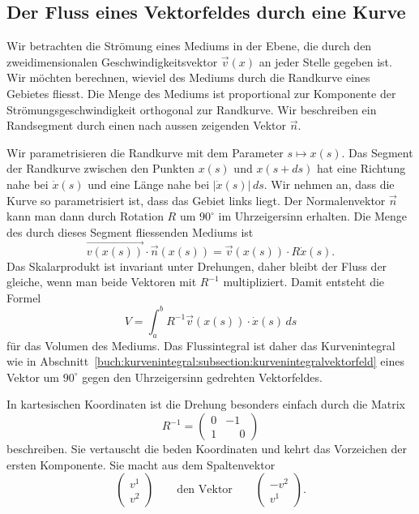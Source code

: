 %
%
\subsection{Der Fluss eines Vektorfeldes durch eine Kurve}
Wir betrachten die Strömung eines Mediums in der Ebene, die durch
den zweidimensionalen Geschwindigkeitsvektor $\vec{v}(x)$ an jeder
Stelle gegeben ist.
Wir möchten berechnen, wieviel des Mediums durch die Randkurve
eines Gebietes fliesst.
Die Menge des Mediums ist proportional zur Komponente der
Strömungsgeschwindigkeit orthogonal zur Randkurve.
%
Wir beschreiben ein Randsegment durch einen nach aussen
zeigenden Vektor $\vec{n}$.

Wir parametrisieren die Randkurve mit dem Parameter $s\mapsto x(s)$.
Das Segment der Randkurve zwischen den Punkten $x(s)$ und $x(s+ds)$
hat eine Richtung nahe bei $\dot{x}(s)$ und eine Länge 
nahe bei $|\dot{x}(s)|\,ds$.
Wir nehmen an, dass die Kurve so parametrisiert ist, dass das Gebiet
links liegt.
Der Normalenvektor $\vec{n}$ kann man dann durch Rotation $R$ um
$90^\circ$ im Uhrzeigersinn erhalten.
Die Menge des durch dieses Segment fliessenden Mediums ist
\[
\vec{v(x(s))}\cdot \vec{n}(x(s))
=
\vec{v}(x(s)) \cdot R\dot{x}(s).
\]
Das Skalarprodukt ist invariant unter Drehungen, daher bleibt der
Fluss der gleiche, wenn man beide Vektoren mit $R^{-1}$ multipliziert.
Damit entsteht die Formel
\[
V
=
\int_a^b 
R^{-1}\vec{v}(x(s))\cdot \dot{x}(s)
\,ds
\]
für das Volumen des Mediums.
Das Flussintegral ist daher das Kurvenintegral wie in
Abschnitt~\ref{buch:kurvenintegral:subsection:kurvenintegralvektorfeld}
eines Vektor um $90^\circ$ gegen den Uhrzeigersinn gedrehten
Vektorfeldes.

In kartesischen Koordinaten ist die Drehung besonders einfach durch
die Matrix 
\[
R^{-1}
=
\begin{pmatrix}
0&-1\\
1&\phantom{-}0
\end{pmatrix}
\]
beschreiben.
Sie vertauscht die beden Koordinaten und kehrt das Vorzeichen
der ersten Komponente.
Sie macht aus dem Spaltenvektor
\[
\begin{pmatrix}
v^1\\v^2
\end{pmatrix}
\qquad
\text{den Vektor}
\qquad
\begin{pmatrix}
-v^2\\v^1
\end{pmatrix}.
\]


